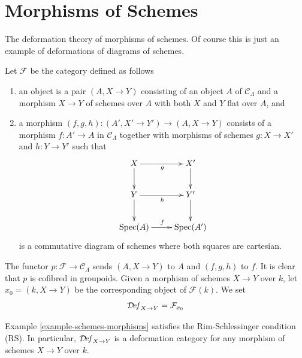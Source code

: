 \section{Morphisms of Schemes}
\label{section-schemes-morphisms}

\noindent
The deformation theory of morphisms of schemes.
Of course this is just an example of
deformations of diagrams of schemes.

\begin{example}
\label{example-schemes-morphisms}
Let $\mathcal{F}$ be the category defined as follows
\begin{enumerate}
\item an object is a pair $(A, X \to Y)$ consisting of an
object $A$ of $\mathcal{C}_\Lambda$ and a morphism
$X \to Y$ of schemes over $A$ with both $X$ and $Y$ flat over $A$, and
\item a morphism $(f, g, h) : (A', X' \to Y') \to (A, X \to Y)$ consists of
a morphism $f : A' \to A$ in $\mathcal{C}_\Lambda$ together
with morphisms of schemes $g : X \to X'$ and $h : Y \to Y'$ such that
$$
\xymatrix{
X \ar[r]_g \ar[d] & X' \ar[d] \\
Y \ar[r]_h \ar[d] & Y' \ar[d] \\
\Spec(A) \ar[r]^f & \Spec(A')
}
$$
is a commutative diagram of schemes where both squares are cartesian.
\end{enumerate}
The functor $p : \mathcal{F} \to \mathcal{C}_\Lambda$ sends $(A, X \to Y)$
to $A$ and $(f, g, h)$ to $f$. It is clear that $p$ is cofibred in groupoids.
Given a morphism of schemes $X \to Y$ over $k$, let $x_0 = (k, X \to Y)$
be the corresponding object of $\mathcal{F}(k)$. We set
$$
\mathcal{D}\!\mathit{ef}_{X \to Y} = \mathcal{F}_{x_0}
$$
\end{example}

\begin{lemma}
\label{lemma-schemes-morphisms-RS}
Example \ref{example-schemes-morphisms}
satisfies the Rim-Schlessinger condition (RS).
In particular, $\mathcal{D}\!\mathit{ef}_{X \to Y}$ is a deformation category
for any morphism of schemes $X \to Y$ over $k$.
\end{lemma}

